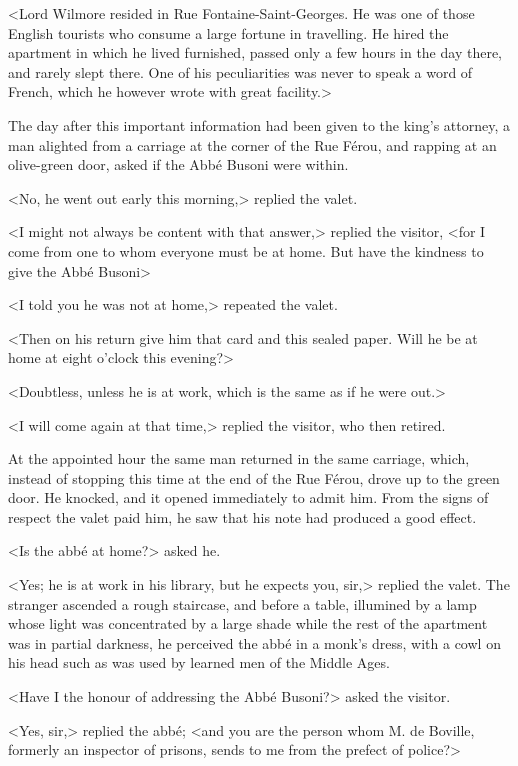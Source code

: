  <Lord Wilmore resided in Rue Fontaine-Saint-Georges. He was one of those English tourists who consume a large fortune in travelling. He hired the apartment in which he lived furnished, passed only a few hours in the day there, and rarely slept there. One of his peculiarities was never to speak a word of French, which he however wrote with great facility.> 

 The day after this important information had been given to the king's attorney, a man alighted from a carriage at the corner of the Rue Férou, and rapping at an olive-green door, asked if the Abbé Busoni were within. 

 <No, he went out early this morning,> replied the valet. 

 <I might not always be content with that answer,> replied the visitor, <for I come from one to whom everyone must be at home. But have the kindness to give the Abbé Busoni\longdash> 

 <I told you he was not at home,> repeated the valet. 

 <Then on his return give him that card and this sealed paper. Will he be at home at eight o'clock this evening?> 

 <Doubtless, unless he is at work, which is the same as if he were out.> 

 <I will come again at that time,> replied the visitor, who then retired. 

 At the appointed hour the same man returned in the same carriage, which, instead of stopping this time at the end of the Rue Férou, drove up to the green door. He knocked, and it opened immediately to admit him. From the signs of respect the valet paid him, he saw that his note had produced a good effect. 

 <Is the abbé at home?> asked he. 

 <Yes; he is at work in his library, but he expects you, sir,> replied the valet. The stranger ascended a rough staircase, and before a table, illumined by a lamp whose light was concentrated by a large shade while the rest of the apartment was in partial darkness, he perceived the abbé in a monk's dress, with a cowl on his head such as was used by learned men of the Middle Ages. 

 <Have I the honour of addressing the Abbé Busoni?> asked the visitor. 

 <Yes, sir,> replied the abbé; <and you are the person whom M. de Boville, formerly an inspector of prisons, sends to me from the prefect of police?> 

